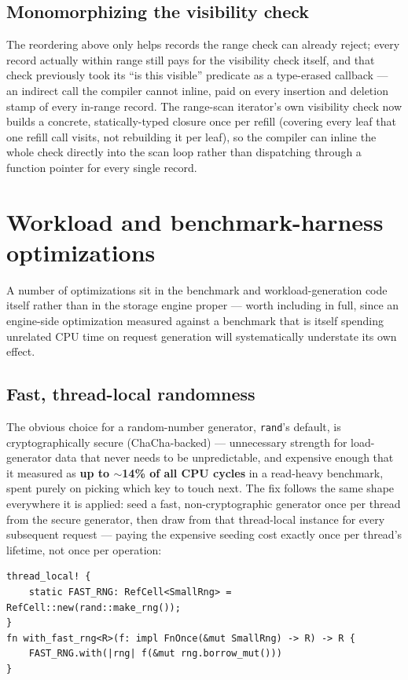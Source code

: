 \documentclass[11pt]{article}
\newcommand{\code}[1]{\texttt{#1}}
\begin{document}
\subsection{Monomorphizing the visibility check}

The reordering above only helps records the range check can already reject; every
record actually within range still pays for the visibility check itself, and that
check previously took its ``is this visible'' predicate as a type-erased callback ---
an indirect call the compiler cannot inline, paid on every insertion and deletion
stamp of every in-range record. The range-scan iterator's own visibility check now
builds a concrete, statically-typed closure once per refill (covering every leaf that
one refill call visits, not rebuilding it per leaf), so the compiler can inline the
whole check directly into the scan loop rather than dispatching through a function
pointer for every single record.

\section{Workload and benchmark-harness optimizations}
\label{sec:workload}

A number of optimizations sit in the benchmark and workload-generation code itself
rather than in the storage engine proper --- worth including in full, since an
engine-side optimization measured against a benchmark that is itself spending
unrelated CPU time on request generation will systematically understate its own
effect.

\subsection{Fast, thread-local randomness}

The obvious choice for a random-number generator, \code{rand}'s default, is
cryptographically secure (ChaCha-backed) --- unnecessary strength for load-generator
data that never needs to be unpredictable, and expensive enough that it measured as
\textbf{up to $\sim$14\% of all CPU cycles} in a read-heavy benchmark, spent purely on
picking which key to touch next. The fix follows the same shape everywhere it is
applied: seed a fast, non-cryptographic generator once per thread from the secure
generator, then draw from that thread-local instance for every subsequent request ---
paying the expensive seeding cost exactly once per thread's lifetime, not once per
operation:

\begin{lstlisting}
thread_local! {
    static FAST_RNG: RefCell<SmallRng> = RefCell::new(rand::make_rng());
}
fn with_fast_rng<R>(f: impl FnOnce(&mut SmallRng) -> R) -> R {
    FAST_RNG.with(|rng| f(&mut rng.borrow_mut()))
}
\end{lstlisting}
\end{document}
